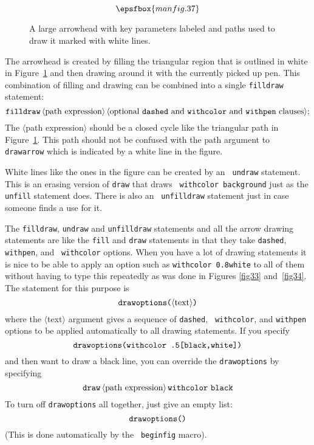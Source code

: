 \documentclass{article} %
\newcommand\descr[1]{{\langle\hbox{#1}\rangle}}
\newcommand\invisgap{\nobreak\hskip0pt\relax}
\newcommand\tdescr[1]{$\langle$\invisgap#1\invisgap$\rangle$}
\begin{document}
\begin{figure}[htp]
$$ \epsfbox{manfig.37} $$
\caption[A large arrowhead with key parameters labeled.]
        {A large arrowhead with key parameters labeled and paths used to
        draw it marked with white lines.}
\label{fig37}
\end{figure}

The arrowhead is created by filling the triangular region that is
outlined in white in Figure~\ref{fig37} and then drawing around it with
the currently picked up pen.  This combination of filling and drawing
can be combined into a single {\tt filldraw}
statement\label{Dfildrw}:
$$ {\tt filldraw}\, \descr{path expression}\,
   \descr{optional {\tt dashed} and {\tt withcolor} and {\tt withpen} clauses};
$$
The \tdescr{path expression} should be a closed cycle like the
triangular path in Figure~\ref{fig37}.  This path should not be confused
with the path argument to {\tt drawarrow} which is indicated by a white
line in the figure.

White lines like the ones in the figure can be created by an {\tt
undraw}\label{Dundraw} statement.  This is
an erasing version of {\tt draw} that draws {\tt
withcolor background} just as the
{\tt unfill} statement does.  There is also an {\tt
unfilldraw}\label{Dunfdrw}
statement just in case someone finds a use for it.

The {\tt filldraw}, {\tt undraw} and {\tt unfilldraw} statements and all
the arrow drawing statements are like the {\tt fill} and {\tt draw}
statements in that they take {\tt dashed},
{\tt withpen}, and {\tt
withcolor} options.  When you have a
lot of drawing statements it is nice to be able to apply an option such
as {\tt withcolor 0.8white} to all of them without having to type this
repeatedly as was done in Figures \ref{fig33} and~\ref{fig34}.  The
statement for this purpose
is\label{Ddropts}
$$ \hbox{\tt drawoptions(} \descr{text} \hbox{\tt )}  $$
where the \tdescr{text} argument gives a sequence of {\tt dashed}, {\tt
withcolor}, and {\tt withpen} options to be applied automatically to all
drawing statements.  If you specify
$$ \hbox{\tt drawoptions(withcolor .5[black,white])} $$
and then want to draw a black line, you can override the {\tt drawoptions}
by specifying
$$ {\tt draw}\, \descr{path expression}\, {\tt withcolor\ black} $$
To turn off {\tt drawoptions} all together, just give an empty list:
$$ \hbox{\tt drawoptions()} $$
(This is done automatically by the {\tt
beginfig} macro).
\end{document}
